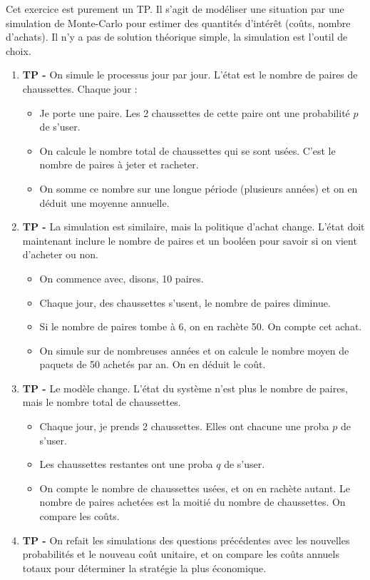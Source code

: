 \documentclass[solutions]{exercices}
\begin{document}
\begin{solution}
	Cet exercice est purement un TP. Il s'agit de modéliser une situation par une simulation de Monte-Carlo pour estimer des quantités d'intérêt (coûts, nombre d'achats). Il n'y a pas de solution théorique simple, la simulation est l'outil de choix.
	\begin{enumerate}
		\item \textbf{TP -} On simule le processus jour par jour. L'état est le nombre de paires de chaussettes. Chaque jour :
		      \begin{itemize}
			      \item Je porte une paire. Les 2 chaussettes de cette paire ont une probabilité $p$ de s'user.
			      \item On calcule le nombre total de chaussettes qui se sont usées. C'est le nombre de paires à jeter et racheter.
			      \item On somme ce nombre sur une longue période (plusieurs années) et on en déduit une moyenne annuelle.
		      \end{itemize}
		\item \textbf{TP -} La simulation est similaire, mais la politique d'achat change. L'état doit maintenant inclure le nombre de paires et un booléen pour savoir si on vient d'acheter ou non.
		      \begin{itemize}
			      \item On commence avec, disons, 10 paires.
			      \item Chaque jour, des chaussettes s'usent, le nombre de paires diminue.
			      \item Si le nombre de paires tombe à 6, on en rachète 50. On compte cet achat.
			      \item On simule sur de nombreuses années et on calcule le nombre moyen de paquets de 50 achetés par an. On en déduit le coût.
		      \end{itemize}
		\item \textbf{TP -} Le modèle change. L'état du système n'est plus le nombre de paires, mais le nombre total de chaussettes.
		      \begin{itemize}
			      \item Chaque jour, je prends 2 chaussettes. Elles ont chacune une proba $p$ de s'user.
			      \item Les chaussettes restantes ont une proba $q$ de s'user.
			      \item On compte le nombre de chaussettes usées, et on en rachète autant. Le nombre de paires achetées est la moitié du nombre de chaussettes. On compare les coûts.
		      \end{itemize}
		\item \textbf{TP -} On refait les simulations des questions précédentes avec les nouvelles probabilités et le nouveau coût unitaire, et on compare les coûts annuels totaux pour déterminer la stratégie la plus économique.
	\end{enumerate}
\end{solution}
\end{document}
